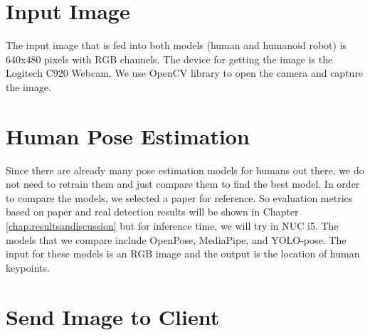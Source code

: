 \section{Input Image}
\label{sec:input-image}

The input image that is fed into both models (human and humanoid robot) is 640x480 pixels with RGB channels. The device for getting the image is the Logitech C920 Webcam. We use OpenCV library to open the camera and capture the image.


\section{Human Pose Estimation}
\label{sec:human-pose-estimation}

Since there are already many pose estimation models for humans out there, we do not need to retrain them and just compare them to find the best model. In order to compare the models, we selected a paper for reference.
So evaluation metrics based on paper and real detection results will be shown in Chapter \ref{chap:resultsandiscussion} but for inference time, we will try in NUC i5. The models that we compare include OpenPose, MediaPipe, and YOLO-pose.
The input for these models is an RGB image and the output is the location of human keypoints.


\section{Send Image to Client}
\label{sec:send-image-to-client}

